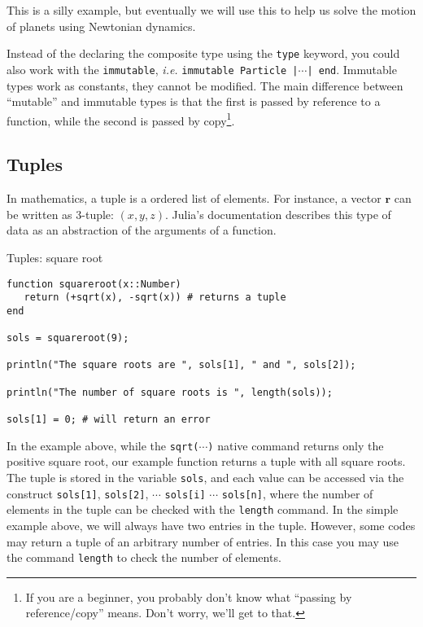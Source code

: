 This is a silly example, but eventually we will use this to help us solve the motion of planets using Newtonian dynamics.

Instead of the declaring the composite type using the \texttt{type} keyword, you could also work with the \texttt{immutable}, \textit{i.e.}
\texttt{immutable Particle |$\cdots$| end}. Immutable types work as constants, they cannot be modified. The main difference between ``mutable'' and immutable types is that the first is passed by reference to a function, while the second is passed by copy\footnote{If you are a beginner, you probably don't know what ``passing by reference/copy'' means. Don't worry, we'll get to that.}.

\subsection{Tuples}

In mathematics, a tuple is a ordered list of elements. For instance, a vector $\bm{r}$ can be written as 3-tuple: $(x, y, z)$. Julia's documentation describes this type of data as an abstraction of the arguments of a function.

\begin{example}{Tuples: square root}
\begin{verbatim}
function squareroot(x::Number)
   return (+sqrt(x), -sqrt(x)) # returns a tuple
end

sols = squareroot(9);

println("The square roots are ", sols[1], " and ", sols[2]);

println("The number of square roots is ", length(sols));

sols[1] = 0; # will return an error
\end{verbatim}
\end{example}

In the example above, while the \texttt{sqrt($\cdots$)} native command returns only the positive square root, our example function returns a tuple with all square roots. The tuple is stored in the variable \texttt{sols}, and each value can be accessed via the construct \texttt{sols[1]}, \texttt{sols[2]}, $\cdots$ \texttt{sols[i]} $\cdots$ \texttt{sols[n]}, where the number of elements in the tuple can be checked with the \texttt{length} command. In the simple example above, we will always have two entries in the tuple. However, some codes may return a tuple of an arbitrary number of entries. In this case you may use the command \texttt{length} to check the number of elements.

